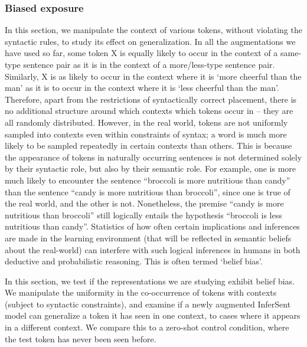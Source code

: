 \subsubsection{Biased exposure}

In this section, we manipulate the context of various tokens, without violating the syntactic rules, to study its effect on generalization. In all the augmentations we have used so far, some token X is equally likely to occur in the context of a same-type sentence pair as it is in the context of a more/less-type sentence pair. Similarly, X is as likely to occur in the context where it is `more cheerful than the man' as it is to occur in the context where it is `less cheerful than the man'. Therefore, apart from the restrictions of syntactically correct placement, there is no additional structure around which contexts which tokens occur in -- they are all randomly distributed. 
However, in the real world, tokens are not uniformly sampled into contexts even within constraints of syntax; a word is much more likely to be sampled repeatedly in certain contexts than others. This is because the appearance of tokens in naturally occurring sentences is not determined solely by their syntactic role, but also by their semantic role.
For example, one is more much likely to encounter the sentence ``broccoli is more nutritious than candy'' than the sentence ``candy is more nutritious than broccoli'', since one is true of the real world, and the other is not. Nonetheless, the premise ``candy is more nutritious than broccoli'' still logically entails the hypothesis ``broccoli is less nutritious than candy''. Statistics of how often certain implications and inferences are made in the learning environment (that will be reflected in semantic beliefs about the real-world) can interfere with such logical inferences in humans in both deductive \citep{evans1983conflict} and probabilistic \citep{evans2002background} reasoning. This is often termed `belief bias'. 


In this section, we test if the representations we are studying exhibit belief bias. We manipulate the uniformity in the co-occurrence of tokens with contexts (subject to syntactic constraints), and examine if a newly augmented InferSent model can generalize a token it has seen in one context, to cases where it appears in a different context. We compare this to a zero-shot control condition, where the test token has never been seen before.


